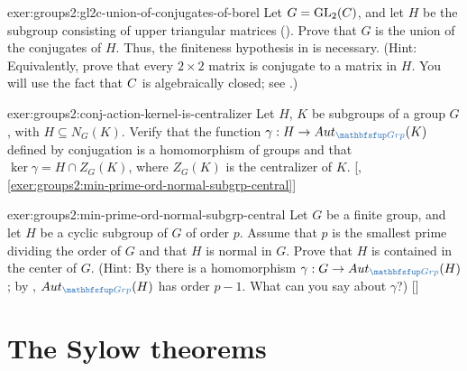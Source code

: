 \begin{exer}{}{exer:groups2:gl2c-union-of-conjugates-of-borel}
  Let $G = \mathrm{GL}_2(C)$, and let $H$ be the subgroup consisting
  of upper triangular matrices
  (). Prove that $G$ is
  the union of the conjugates of $H$. Thus, the finiteness hypothesis
  in  is
  necessary. (Hint: Equivalently, prove that every $2 \times 2$ matrix
  is conjugate to a matrix in $H$. You will use the fact that $C$ is
  algebraically closed; see
  .)
\end{exer}
\begin{exer}{}{exer:groups2:conj-action-kernel-is-centralizer}
  \exerused{} Let $H$, $K$ be subgroups of a group $G$, with
  $H \subseteq N_G(K)$.  Verify that the function
  $\gamma : H \to \Aut_{\categ{Grp}}(K)$ defined by conjugation is a
  homomorphism of groups and that $\ker\gamma = H \cap Z_G(K)$, where
  $Z_G(K)$ is the centralizer of $K$.
  [,
  \ref{exer:groups2:min-prime-ord-normal-subgrp-central}]
\end{exer}
\begin{exer}{}{exer:groups2:min-prime-ord-normal-subgrp-central}
  \exerused{} Let $G$ be a finite group, and let $H$ be a cyclic
  subgroup of $G$ of order $p$. Assume that $p$ is the smallest prime
  dividing the order of $G$ and that $H$ is normal in $G$. Prove that
  $H$ is contained in the center of $G$. (Hint: By
   there is a
  homomorphism $\gamma : G \to \Aut_{\categ{Grp}}(H)$; by
  , $\Aut_{\categ{Grp}}(H)$ has
  order $p - 1$. What can you say about $\gamma$?)
  []
\end{exer}

\section{The Sylow theorems}
\label{sec:groups2:the-sylow-theorems}


